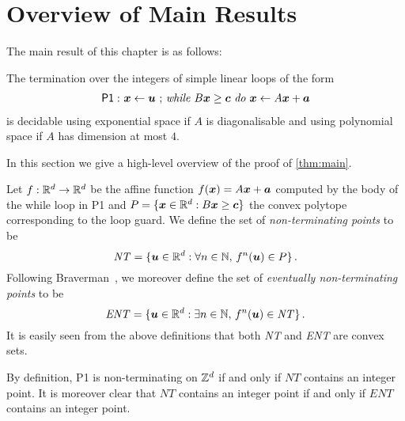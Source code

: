 \section{Overview of Main Results}
\label{sec:overview}
The main result of this chapter is as follows:
\begin{theorem}
  The termination over the integers of simple linear loops of the form
\begin{gather*}
\mathsf{P1:}\  \mbox{$\boldsymbol{x}\gets \boldsymbol{u}$ ;
\textit{while} $B\boldsymbol{x} \geq \boldsymbol{c}$ \textit{do}
$\boldsymbol{x}\leftarrow A\boldsymbol{x}+\boldsymbol{a}$}
\end{gather*}
is decidable using exponential space if $A$ is diagonalisable and
using polynomial space if $A$ has dimension at most $4$.
\label{thm:main}
\end{theorem}
In this section we give a high-level overview of the proof of \cref{thm:main}.

Let $f:\mathbb{R}^{d}\rightarrow \mathbb{R}^{d}$ be the affine function
$f(\boldsymbol{x})=A\boldsymbol{x}+\boldsymbol a$ computed by the body
of the while loop in \textsf{P1} and $P=\{ \boldsymbol{x} \in
\mathbb{R}^{d}: B \boldsymbol{x}\geq \boldsymbol{c}\}$ the convex polytope
corresponding to the loop guard.  We define the set of
\emph{non-terminating points} to be
\[ \mathit{NT} = \{ \boldsymbol{u}\in \mathbb{R}^{d} : \forall n \in
\mathbb{N},\, f^n(\boldsymbol{u}) \in P \} \, .\] Following
Braverman~\cite{Bra06}, we moreover define the set of \emph{eventually
  non-terminating points} to be
\[ \mathit{ENT} = \{ \boldsymbol{u}\in \mathbb{R}^{d} : \exists n \in
\mathbb{N},\, f^n(\boldsymbol{u}) \in \mathit{NT} \} \, .\]
It is easily seen from the above definitions that both \textit{NT} and
\textit{ENT} are convex sets.

By definition, \textsf{P1} is non-terminating on $\mathbb{Z}^{d}$ if
and only if $\mathit{NT}$ contains an integer point.  It is moreover
clear that $\mathit{NT}$ contains an integer point if and only if
$\mathit{ENT}$ contains an integer point.


